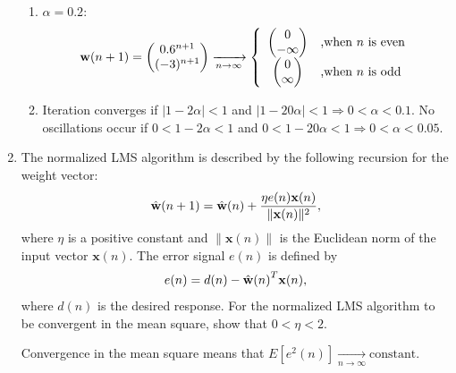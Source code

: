 \begin{enumerate}
\begin{solution}
\begin{enumerate}
    \item $\alpha = 0.2$: 
      \begin{equation*}
        {\bf{w}}(n+1) = \begin{pmatrix} 0.6^{n+1} \\
          (-3)^{n+1} \end{pmatrix} \xrightarrow[n\rightarrow\infty]{}\left\{\begin{array}{cl}\begin{pmatrix}0\\-\infty\end{pmatrix} & \mbox{,when } n\mbox{ is even}\\
            \begin{pmatrix}0\\\infty\end{pmatrix} & \mbox{,when } n\mbox{ is odd}\end{array}\right.
      \end{equation*}

    \item Iteration converges if $| 1 - 2 \alpha | < 1$ and $| 1 - 20 \alpha | < 1 \Rightarrow 0 < \alpha < 0.1$. 
      No oscillations occur if $0 < 1 - 2 \alpha < 1$ and $0 < 1 - 20 \alpha < 1 \Rightarrow 0 < \alpha < 0.05$.

    \end{enumerate}

  \end{solution}

\item The normalized LMS algorithm is described by the following
  recursion for the weight vector:
  \begin{equation*}
    \Hat{\mathbf{w}}(n+1)= \Hat{\mathbf{w}}(n) +\frac{\eta e(n)
      \mathbf{x}(n)} {\| \mathbf{x}(n) \|^2},
  \end{equation*}
  where $\eta$ is a positive constant and $\|\mathbf{x}(n) \|$ is the
  Euclidean norm of the input vector $\mathbf{x}(n)$. The error
  signal $e(n)$ is defined by
  \begin{equation*}
    e(n)=d(n)-{\Hat{\mathbf{w}}(n)}^T \mathbf{x}(n),
  \end{equation*}
  where $d(n)$ is the desired response. For the normalized LMS algorithm to
  be convergent in the mean square, show that $0< \eta <2$.

  \begin{solution}

    Convergence in the mean square means that
    $E\left[e^2(n)\right]\xrightarrow[n\rightarrow\infty]{}\mbox{constant}$.


\end{solution}
\end{enumerate}
